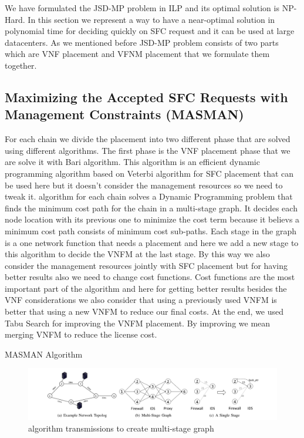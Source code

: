 We have formulated the JSD-MP problem in ILP and its optimal solution is NP-Hard.
In this section we represent a way to have a near-optimal solution in polynomial time for deciding quickly on SFC request and it can be used at large datacenters.
As we mentioned before JSD-MP problem consists of two parts which are VNF placement and VFNM placement that we formulate them together.

\subsection{Maximizing the Accepted SFC Requests with Management Constraints (MASMAN)}
For each chain we divide the placement into two different phase that are solved using different algorithms.
The first phase is the VNF placement phase that we are solve it with Bari \cite{Bari2015} algorithm.
This algorithm is an efficient dynamic programming algorithm based on Veterbi algorithm for SFC placement that can be used here but it doesn't consider the management resources so we need to tweak it.
\cite{Bari2015} algorithm for each chain solves a Dynamic Programming problem that finds the minimum cost path for the chain in a multi-stage graph.
It decides each node location with its previous one to minimize the cost term because it believs a minimum cost path consists of minimum cost sub-paths.
Each stage in the graph is a one network function that needs a placement and here we add a new stage to this algorithm to decide the VNFM at the last stage. By this way we also consider the management resources jointly with SFC placement but for having better results also we need to change cost functions.
Cost functions are the most important part of the \cite{Bari2015} algorithm and here for getting better results besides the VNF considerations we also consider
that using a previously used VNFM is better that using a new VNFM to reduce our final costs.
At the end, we used Tabu Search for improving the VNFM placement. By improving we mean merging VNFM to reduce the license cost.

\begin{algorithm}
  \caption{MASMAN Algorithm}
  \label{alg:masman}
  \begin{algorithmic}[1]
    \EndFunction
  \end{algorithmic}
\end{algorithm}

\begin{figure}[h!]
  \centering
  \includegraphics[width=\textwidth]{images/bari.png}
  \caption{\cite{Bari2015} algorithm transmissions to create multi-stage graph}
\end{figure}

